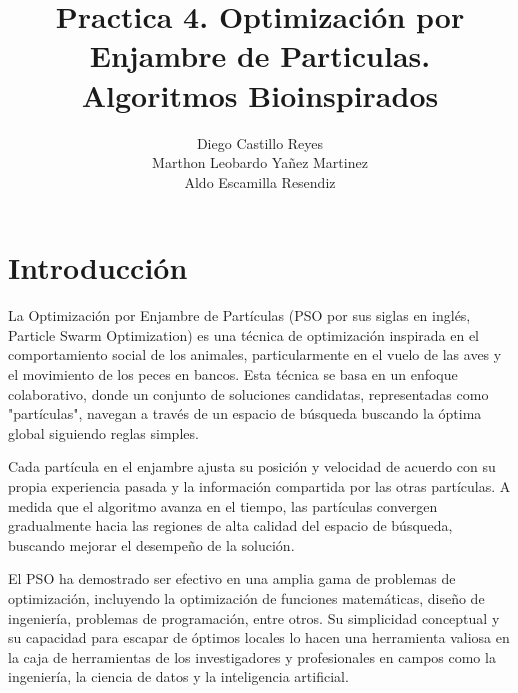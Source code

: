 \documentclass{report}
\title{\Huge{\textbf{Practica 4. Optimización por Enjambre de Particulas.}}\\
\Large{\textbf{Algoritmos Bioinspirados}}}
\author{Diego Castillo Reyes\\Marthon Leobardo Yañez Martinez\\Aldo Escamilla Resendiz}
\begin{document}
    \maketitle
    \tableofcontents
    \newpage
    \section{Introducción}
    La Optimización por Enjambre de Partículas (PSO por sus siglas en inglés, Particle Swarm Optimization) es una técnica de optimización inspirada en el comportamiento social de los animales, particularmente en el vuelo de las aves y el movimiento de los peces en bancos. Esta técnica se basa en un enfoque colaborativo, donde un conjunto de soluciones candidatas, representadas como "partículas", navegan a través de un espacio de búsqueda buscando la óptima global siguiendo reglas simples.

    Cada partícula en el enjambre ajusta su posición y velocidad de acuerdo con su propia experiencia pasada y la información compartida por las otras partículas. A medida que el algoritmo avanza en el tiempo, las partículas convergen gradualmente hacia las regiones de alta calidad del espacio de búsqueda, buscando mejorar el desempeño de la solución.

    El PSO ha demostrado ser efectivo en una amplia gama de problemas de optimización, incluyendo la optimización de funciones matemáticas, diseño de ingeniería, problemas de programación, entre otros. Su simplicidad conceptual y su capacidad para escapar de óptimos locales lo hacen una herramienta valiosa en la caja de herramientas de los investigadores y profesionales en campos como la ingeniería, la ciencia de datos y la inteligencia artificial.
\end{document}
